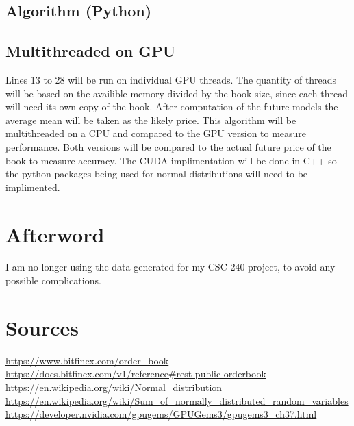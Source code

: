 \documentclass[12pt]{article}
\begin{document}
\newpage
\subsection{Algorithm (Python)}


\subsection{Multithreaded on GPU}
Lines 13 to 28  will be run on individual GPU threads. 
The quantity of threads will be based on the availible memory divided by the book size, since each thread will need its own copy of the book. 
After computation of the future models the average mean will be taken as the likely price. 
This algorithm will be multithreaded on a CPU and compared to the GPU version to measure performance.
Both versions will be compared to the actual future price of the book to measure accuracy.
The CUDA implimentation will be done in C++ so the python packages being used for normal distributions will need to be implimented.


\section{Afterword}
I am no longer using the data generated for my CSC 240 project, to avoid any possible complications.

\section{Sources}
\url{https://www.bitfinex.com/order_book} \\
\url{https://docs.bitfinex.com/v1/reference#rest-public-orderbook} \\
\url{https://en.wikipedia.org/wiki/Normal_distribution} \\
\url{https://en.wikipedia.org/wiki/Sum_of_normally_distributed_random_variables} \\
\url{https://developer.nvidia.com/gpugems/GPUGems3/gpugems3_ch37.html}
\end{document}
